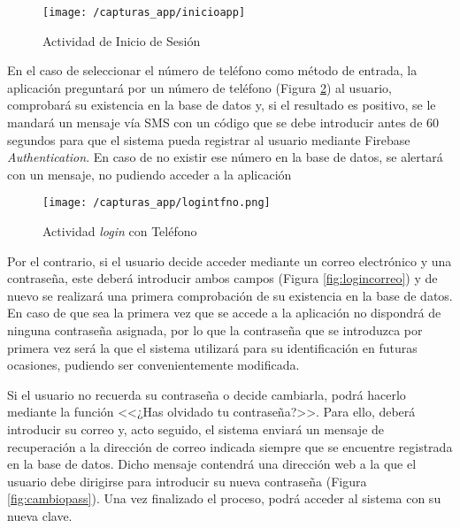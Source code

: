 \begin{figure}[!h]
	\begin{center}
		\texttt{[image: /capturas\_app/inicioapp]}
		\caption{Actividad de Inicio de Sesión}
		\label{fig:login1}
	\end{center}
\end{figure}

\newpage

En el caso de seleccionar el número de teléfono como método de entrada, la aplicación preguntará por un número de teléfono (Figura \ref{fig:logintfno}) al usuario, comprobará su existencia en la base de datos y, si el resultado es positivo, se le mandará un mensaje vía \acs{SMS} con un código que se debe introducir antes de 60 segundos para que el sistema pueda registrar al usuario mediante Firebase \textit{Authentication}. En caso de no existir ese número en la base de datos, se alertará con un mensaje, no pudiendo acceder a la aplicación

\begin{figure}[!h]
	\begin{center}
		\texttt{[image: /capturas\_app/logintfno.png]}
		\caption{Actividad \textit{login} con Teléfono}
		\label{fig:logintfno}
	\end{center}
\end{figure}

Por el contrario, si el usuario decide acceder mediante un correo electrónico y una contraseña, este deberá introducir ambos campos (Figura \ref{fig:logincorreo}) y de nuevo se realizará una primera comprobación de su existencia en la base de datos. En caso de que sea la primera vez que se accede a la aplicación no dispondrá de ninguna contraseña asignada, por lo que la contraseña que se introduzca por primera vez será la que el sistema utilizará para su identificación en futuras ocasiones, pudiendo ser convenientemente modificada.

\clearpage

Si el usuario no recuerda su contraseña o decide cambiarla, podrá hacerlo mediante la función <<¿Has olvidado tu contraseña?>>. Para ello, deberá introducir su correo y, acto seguido, el sistema enviará un mensaje de recuperación a la dirección de correo indicada siempre que se encuentre registrada en la base de datos. Dicho mensaje contendrá una dirección web a la que el usuario debe dirigirse para introducir su nueva contraseña (Figura \ref{fig:cambiopass}). Una vez finalizado el proceso, podrá acceder al sistema con su nueva clave.

